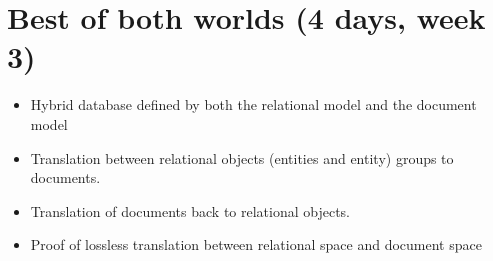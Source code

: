 		\section{Best of both worlds (4 days, week 3)}
	\begin{itemize}
		\item Hybrid database defined by both the relational model and the document model
		\item Translation between relational objects (entities and entity) groups to documents.
		\item Translation of documents back to relational objects.
		\item Proof of lossless translation between relational space and document space
	\end{itemize}